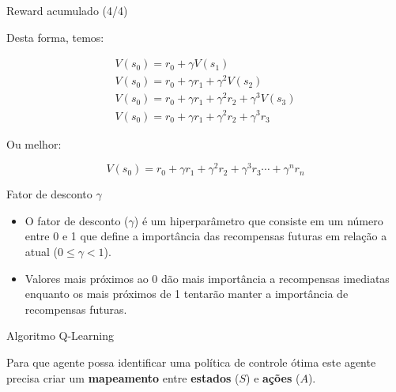 \documentclass{beamer}
\begin{document}
\begin{frame}{Reward acumulado (4/4)}

Desta forma, temos: 

\begin{eqnarray}
V(s_{0}) = r_{0} + \gamma V(s_{1}) \nonumber \\
V(s_{0}) = r_{0} + \gamma r_{1} + \gamma^{2} V(s_{2}) \nonumber \\
V(s_{0}) = r_{0} + \gamma r_{1} + \gamma^{2} r_{2} + \gamma^{3} V(s_{3}) \nonumber \\
V(s_{0}) = r_{0} + \gamma r_{1} + \gamma^{2} r_{2} + \gamma^{3} r_{3} \nonumber
\end{eqnarray}

Ou melhor: 

\begin{equation}
V(s_{0}) = r_{0} + \gamma r_{1} + \gamma^{2} r_{2} + \gamma^{3} r_{3} \cdots + \gamma^{n}r_{n} \nonumber
\end{equation}


\end{frame}


\begin{frame}{Fator de desconto $\gamma$}
	
	\begin{itemize}
		\item O fator de desconto ($\gamma$) é um hiperparâmetro que consiste 
		em um número entre 0 e 1 que define a importância das recompensas futuras 
		em relação a atual	($0 \leq \gamma < 1$).
		\item Valores mais próximos ao 0 dão mais importância a recompensas 
		imediatas enquanto os mais próximos de 1 tentarão manter a importância 
		de recompensas futuras.
	\end{itemize}
\end{frame}




\begin{frame}{Algoritmo Q-Learning}
	
Para que agente possa identificar uma política de controle ótima este agente 
precisa criar um \textbf{mapeamento} entre \textbf{estados} ($S$) e \textbf{ações} ($A$).

\end{frame}
\end{document}
